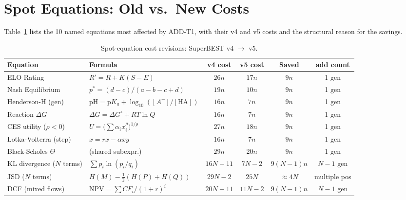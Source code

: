 \documentclass[12pt,a4paper]{article}
\theoremstyle{definition}
\begin{document}
\section{Spot Equations: Old vs.\ New Costs}
\label{sec:spot}

Table~\ref{tab:spot} lists the 10 named equations most affected by ADD-T1,
with their v4 and v5 costs and the structural reason for the savings.

\begin{table}[h]
\centering
\caption{Spot-equation cost revisions: SuperBEST v4 $\to$ v5.}
\label{tab:spot}
\smallskip
\begin{tabular}{@{}lp{3.2cm}cccc@{}}
\toprule
\textbf{Equation} & \textbf{Formula} & \textbf{v4 cost} & \textbf{v5 cost}
  & \textbf{Saved} & \textbf{add count} \\
\midrule
ELO Rating        & $R' = R + K(S - E)$       & $26n$ & $17n$ & $9n$  & 1 gen \\
Nash Equilibrium  & $p^* = (d-c)/(a-b-c+d)$   & $19n$ & $10n$ & $9n$  & 1 gen \\
Henderson-H (gen) & $\mathrm{pH} = \mathrm{p}K_a + \log_{10}([A^-]/[\mathrm{HA}])$
                                               & $16n$ & $7n$  & $9n$  & 1 gen \\
Reaction $\Delta G$& $\Delta G = \Delta G^\circ + RT\ln Q$
                                               & $16n$ & $7n$  & $9n$  & 1 gen \\
CES utility ($\rho < 0$) & $U = \bigl(\sum \alpha_i x_i^\rho\bigr)^{1/\rho}$
                                               & $27n$ & $18n$ & $9n$  & 1 gen \\
Lotka-Volterra (step) & $\dot x = rx - \alpha xy$
                                               & $16n$ & $7n$  & $9n$  & 1 gen \\
Black-Scholes $\Theta$ & (shared subexpr.)    & $29n$ & $20n$ & $9n$  & 1 gen \\
KL divergence ($N$ terms) & $\sum p_i\ln(p_i/q_i)$ & $16N{-}11$ & $7N{-}2$ & $9(N{-}1)n$ & $N{-}1$ gen \\
JSD ($N$ terms)   & $H(M) - \tfrac{1}{2}(H(P)+H(Q))$
                                               & $29N{-}2$ & $25N$ & $\approx 4N$ & multiple pos \\
DCF (mixed flows) & $\mathrm{NPV} = \sum CF_i/(1+r)^i$
                                               & $20N{-}11$ & $11N{-}2$ & $9(N{-}1)n$ & $N{-}1$ gen \\

\end{tabular}
\end{table}
\end{document}
